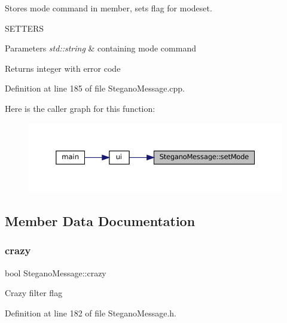 Stores mode command in member, sets flag for modeset. 

S\+E\+T\+T\+E\+RS
\begin{DoxyParams}{Parameters}
{\em std\+::string} & containing mode command \\
\hline
\end{DoxyParams}
\begin{DoxyReturn}{Returns}
integer with error code 
\end{DoxyReturn}


Definition at line 185 of file Stegano\+Message.\+cpp.

Here is the caller graph for this function\+:\nopagebreak
\begin{figure}[H]
\begin{center}
\leavevmode
\includegraphics[width=350pt]{classSteganoMessage_a3e06a73baa5744b5eb9152f4ae65f458_icgraph}
\end{center}
\end{figure}


\subsection{Member Data Documentation}
\mbox{\label{classSteganoMessage_aa66c9e1d0367981d42ede819e1a51131}} 
\subsubsection{\texorpdfstring{crazy}{crazy}}
{\footnotesize\ttfamily bool Stegano\+Message\+::crazy\hspace{0.3cm}{\ttfamily [private]}}

Crazy filter flag 

Definition at line 182 of file Stegano\+Message.\+h.

\mbox{\label{classSteganoMessage_a26b631e00716be7a89cbcf22cf0b7291}} 
